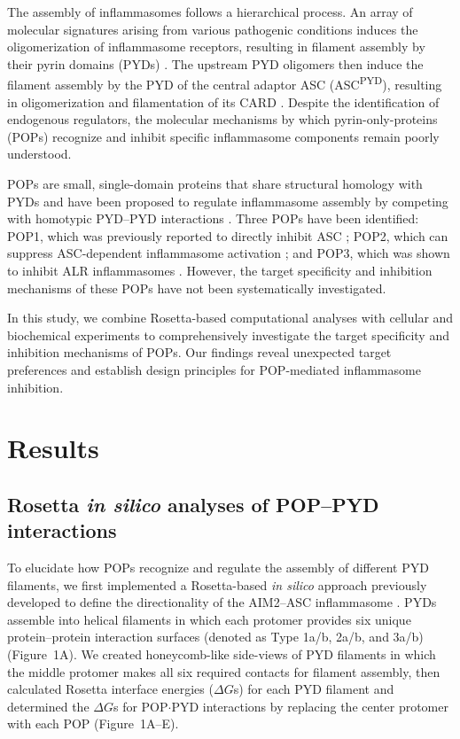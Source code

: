 \documentclass[11pt]{article}
\begin{document}
The assembly of inflammasomes follows a hierarchical process. An array of molecular signatures arising from various pathogenic conditions induces the oligomerization of inflammasome receptors, resulting in filament assembly by their pyrin domains (PYDs) \citep{lu2014unified}. The upstream PYD oligomers then induce the filament assembly by the PYD of the central adaptor ASC (ASC\textsuperscript{PYD}), resulting in oligomerization and filamentation of its CARD \citep{lu2014unified,lu2016molecular}. Despite the identification of endogenous regulators, the molecular mechanisms by which pyrin-only-proteins (POPs) recognize and inhibit specific inflammasome components remain poorly understood.

POPs are small, single-domain proteins that share structural homology with PYDs and have been proposed to regulate inflammasome assembly by competing with homotypic PYD--PYD interactions \citep{dealmeida2015pop1,devi2020update,indramohan2018cops}. Three POPs have been identified: POP1, which was previously reported to directly inhibit ASC \citep{dealmeida2015pop1}; POP2, which can suppress ASC-dependent inflammasome activation \citep{ratsimandresy2017pop2}; and POP3, which was shown to inhibit ALR inflammasomes \citep{khare2014pop3}. However, the target specificity and inhibition mechanisms of these POPs have not been systematically investigated.

In this study, we combine Rosetta-based computational analyses with cellular and biochemical experiments to comprehensively investigate the target specificity and inhibition mechanisms of POPs. Our findings reveal unexpected target preferences and establish design principles for POP-mediated inflammasome inhibition.

\section{Results}

\subsection{Rosetta \textit{in silico} analyses of POP--PYD interactions}

To elucidate how POPs recognize and regulate the assembly of different PYD filaments, we first implemented a Rosetta-based \textit{in silico} approach previously developed to define the directionality of the AIM2--ASC inflammasome \citep{matyszewski2021directionality}. PYDs assemble into helical filaments in which each protomer provides six unique protein--protein interaction surfaces (denoted as Type 1a/b, 2a/b, and 3a/b) (Figure~1A). We created honeycomb-like side-views of PYD filaments in which the middle protomer makes all six required contacts for filament assembly, then calculated Rosetta interface energies ($\Delta G$s) for each PYD filament and determined the $\Delta G$s for POP$\cdot$PYD interactions by replacing the center protomer with each POP (Figure~1A--E).
\end{document}
